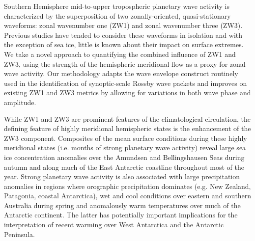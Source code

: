 Southern Hemisphere mid-to-upper tropospheric planetary wave activity is characterized by the superposition of two zonally-oriented, quasi-stationary waveforms: zonal wavenumber one (ZW1) and zonal wavenumber three (ZW3). Previous studies have tended to consider these waveforms in isolation and with the exception of sea ice, little is known about their impact on surface extremes. We take a novel approach to quantifying the combined influence of ZW1 and ZW3, using the strength of the hemispheric meridional flow as a proxy for zonal wave activity. Our methodology adapts the wave envelope construct routinely used in the identification of synoptic-scale Rossby wave packets and improves on existing ZW1 and ZW3 metrics by allowing for variations in both wave phase and amplitude.

While ZW1 and ZW3 are prominent features of the climatological circulation, the defining feature of highly meridional hemispheric states is the enhancement of the ZW3 component. Composites of the mean surface conditions during these highly meridional states (i.e. months of strong planetary wave activity) reveal large sea ice concentration anomalies over the Amundsen and Bellingshausen Seas during autumn and along much of the East Antarctic coastline throughout most of the year. Strong planetary wave activity is also associated with large precipitation anomalies in regions where orographic precipitation dominates (e.g. New Zealand, Patagonia, coastal Antarctica), wet and cool conditions over eastern and southern Australia during spring and anomalously warm temperatures over much of the Antarctic continent. The latter has potentially important implications for the interpretation of recent warming over West Antarctica and the Antarctic Peninsula.
